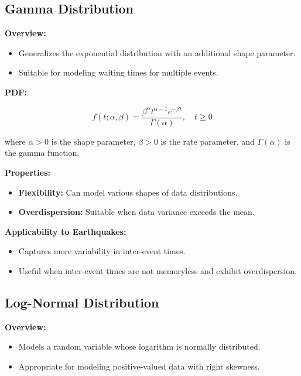 \documentclass{article}
\begin{document}
\subsection{Gamma Distribution}

\textbf{Overview:}

\begin{itemize}
    \item Generalizes the exponential distribution with an additional shape parameter.
    \item Suitable for modeling waiting times for multiple events.
\end{itemize}

\textbf{PDF:}

\[
f(t; \alpha, \beta) = \frac{\beta^\alpha t^{\alpha - 1} e^{-\beta t}}{\Gamma(\alpha)}, \quad t \geq 0
\]

where $\alpha > 0$ is the shape parameter, $\beta > 0$ is the rate parameter, and $\Gamma(\alpha)$ is the gamma function.

\textbf{Properties:}

\begin{itemize}
    \item \textbf{Flexibility:} Can model various shapes of data distributions.
    \item \textbf{Overdispersion:} Suitable when data variance exceeds the mean.
\end{itemize}

\textbf{Applicability to Earthquakes:}

\begin{itemize}
    \item Captures more variability in inter-event times.
    \item Useful when inter-event times are not memoryless and exhibit overdispersion.
\end{itemize}

\subsection{Log-Normal Distribution}

\textbf{Overview:}

\begin{itemize}
    \item Models a random variable whose logarithm is normally distributed.
    \item Appropriate for modeling positive-valued data with right skewness.
\end{itemize}
\end{document}
